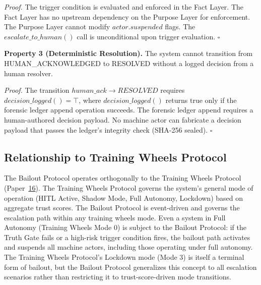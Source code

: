 \textit{Proof.} The trigger condition is evaluated and enforced in the Fact Layer. The Fact Layer has no upstream dependency on the Purpose Layer for enforcement. The Purpose Layer cannot modify $actor.suspended$ flags. The $escalate\_to\_human()$ call is unconditional upon trigger evaluation. $\square$

\medskip\noindent\textbf{Property 3 (Deterministic Resolution).} The system cannot transition from HUMAN\_ACKNOWLEDGED to RESOLVED without a logged decision from a human resolver.

\textit{Proof.} The transition $human\_ack \rightarrow RESOLVED$ requires $decision\_logged() = \top$, where $decision\_logged()$ returns true only if the forensic ledger append operation succeeds. The forensic ledger append requires a human-authored decision payload. No machine actor can fabricate a decision payload that passes the ledger's integrity check (SHA-256 sealed). $\square$

\subsection{Relationship to Training Wheels Protocol}
The Bailout Protocol operates orthogonally to the Training Wheels Protocol (Paper~\hyperref[sec16]{16}). The Training Wheels Protocol governs the system's general mode of operation (HITL Active, Shadow Mode, Full Autonomy, Lockdown) based on aggregate trust scores. The Bailout Protocol is event-driven and governs the escalation path within any training wheels mode. Even a system in Full Autonomy (Training Wheels Mode 0) is subject to the Bailout Protocol: if the Truth Gate fails or a high-risk trigger condition fires, the bailout path activates and suspends all machine actors, including those operating under full autonomy. The Training Wheels Protocol's Lockdown mode (Mode 3) is itself a terminal form of bailout, but the Bailout Protocol generalizes this concept to all escalation scenarios rather than restricting it to trust-score-driven mode transitions.


